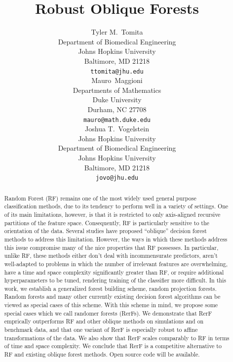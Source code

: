 \documentclass{article}
\title{Robust Oblique Forests}
\author{
  Tyler M.~Tomita \\
  Department of Biomedical Engineering\\
  Johns Hopkins University \\
  Baltimore, MD 21218 \\
  \texttt{ttomita@jhu.edu} \\
  \And
  Mauro~Maggioni \\
  Departments of Mathematics \\
  Duke University \\
  Durham, NC 27708 \\
  \texttt{mauro@math.duke.edu} \\
  \And
  Joshua T.~Vogelstein \\
  Johns Hopkins University \\
  Department of Biomedical Engineering \\
  Johns Hopkins University \\
  Baltimore, MD 21218\\
  \texttt{jovo@jhu.edu} \\
}
\begin{document}

\maketitle

\begin{abstract}
Random Forest (RF) remains one of the most widely used general purpose classification methods, due to its tendency to perform well in a variety of settings. One of its main limitations, however, is that it is restricted to only axis-aligned recursive partitions of the feature space. Consequently, RF is particularly sensitive to the orientation of the data. Several studies have proposed ``oblique'' decision forest methods to address this limitation. However, the ways in which these methods address this issue compromise many of the nice properties that RF possesses. In particular, unlike RF, these methods either don't deal with incommensurate predictors, aren't well-adapted to problems in which the number of irrelevant features are overwhelming, have a time and space complexity significantly greater than RF, or require additional hyperparameters to be tuned, rendering training of the classifier more difficult. In this work, we establish a generalized forest building scheme, random projection forests. Random forests and many other currently existing decision forest algorithms can be viewed as special cases of this scheme. With this scheme in mind, we propose some special cases which we call randomer forests (RerFs). We demonstrate that RerF emprically outperforms RF and other oblique methods on simulations and on benchmark data, and that one variant of RerF is especially robust to affine transformations of the data. We also show that RerF scales comparably to RF in terms of time and space complexity.  We conclude that RerF is a competitive alternative to RF and existing oblique forest methods. Open source code will be available.
\end{abstract}
\end{document}
